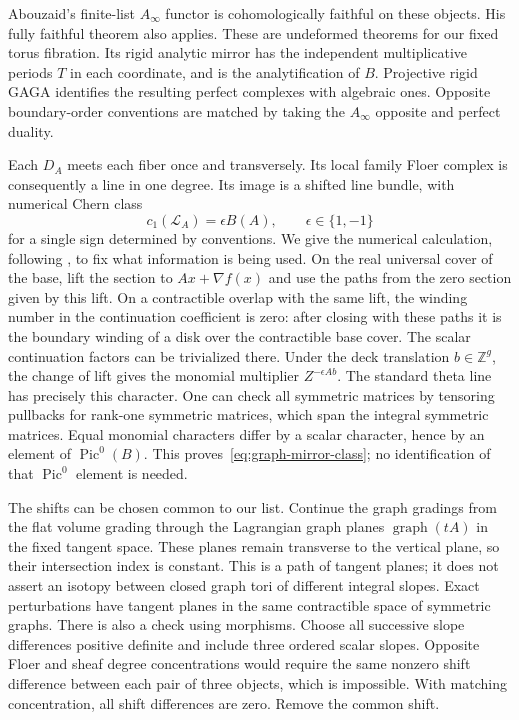 \documentclass[11pt]{article}
\numberwithin{equation}{section}
\theoremstyle{definition}
\theoremstyle{remark}
\begin{document}
Abouzaid's finite-list $A_\infty$ functor
\cite[Theorem~2.10 and the chain-level construction]{HMS:AbouzaidFaithful}
is cohomologically faithful on these objects.  His fully faithful theorem
\cite[Theorem~1.1 and Corollary~1.2]{HMS:AbouzaidHMS} also applies.  These are undeformed
theorems for our fixed torus fibration.  Its rigid analytic mirror has the
independent multiplicative periods $T$ in each coordinate, and is the
analytification of $B$.  Projective rigid GAGA identifies the resulting
perfect complexes with algebraic ones.  Opposite boundary-order conventions
are matched by taking the $A_\infty$ opposite and perfect duality.

Each $D_A$ meets each fiber once and transversely.  Its local family Floer
complex is consequently a line in one degree.  Its image is a shifted
line bundle, with numerical Chern class
\begin{equation}\label{eq:graph-mirror-class}
 c_1(\mathcal L_A)=\epsilon B(A),\qquad \epsilon\in\{1,-1\}
\end{equation}
for a single sign determined by conventions.  We give the numerical
calculation, following \cite[Section~9.1]{W}, to fix what information
is being used.  On the real universal
cover of the base, lift the section to $Ax+\nabla f(x)$ and use the paths
from the zero section given by this lift.  On a contractible overlap with
the same lift, the winding number in the continuation coefficient is zero:
after closing with these paths it is the boundary winding of a disk over
the contractible base cover.  The scalar continuation factors can be
trivialized there.  Under the deck translation $b\in\mathbb Z^g$, the change of
lift gives the monomial multiplier $Z^{-\epsilon Ab}$.  The standard theta
line has precisely this character.  One can check all symmetric matrices
by tensoring pullbacks for rank-one symmetric matrices, which span the
integral symmetric matrices.  Equal monomial characters differ by a
scalar character, hence by an element of $\operatorname{Pic}^0(B)$.
This proves~\eqref{eq:graph-mirror-class}; no identification of that
$\operatorname{Pic}^0$ element is needed.

The shifts can be chosen common to our list.  Continue the graph gradings
from the flat volume grading through the Lagrangian graph planes
$\operatorname{graph}(tA)$ in the fixed tangent space.  These planes
remain transverse to the vertical plane, so their intersection
index is constant.  This is a path of tangent planes; it does not
assert an isotopy between closed graph tori of different integral
slopes.  Exact perturbations have tangent planes in the same
contractible space of symmetric graphs.  There is also a check using morphisms.  Choose all
successive slope differences positive definite and include three ordered
scalar slopes.  Opposite Floer and sheaf degree concentrations would
require the same nonzero shift difference between each pair of three
objects, which is impossible.  With matching concentration, all shift
differences are zero.  Remove the common shift.
\end{document}
